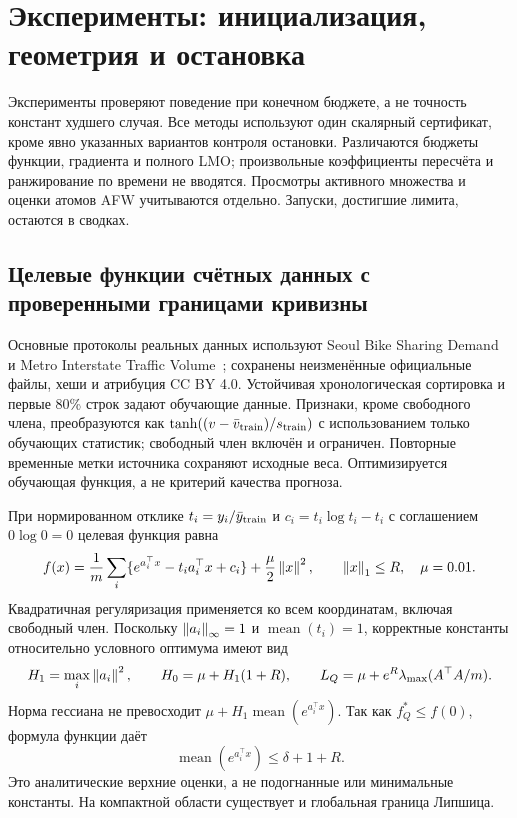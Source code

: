 \section{Эксперименты: инициализация, геометрия и остановка}
\label{sec:experiments}
Эксперименты проверяют поведение при конечном бюджете, а не точность
констант худшего случая. Все методы используют один скалярный
сертификат, кроме явно указанных вариантов контроля остановки.
Различаются бюджеты функции, градиента и полного LMO; произвольные
коэффициенты пересчёта и ранжирование по времени не вводятся.
Просмотры активного множества и оценки атомов AFW учитываются
отдельно. Запуски, достигшие лимита, остаются в сводках.

\subsection{Целевые функции счётных данных с проверенными границами кривизны}
Основные протоколы реальных данных используют Seoul Bike Sharing
Demand~\cite{seoul} и Metro Interstate Traffic Volume~\cite{metro};
сохранены неизменённые официальные файлы, хеши и атрибуция CC BY 4.0.
Устойчивая хронологическая сортировка и первые 80\% строк задают
обучающие данные. Признаки, кроме свободного члена, преобразуются как
$\tanh((v-\bar v_{\rm train})/s_{\rm train})$ с использованием
только обучающих статистик; свободный член включён и ограничен.
Повторные временные метки источника сохраняют исходные веса.
Оптимизируется обучающая функция, а не критерий качества прогноза.

При нормированном отклике $t_i=y_i/\bar y_{\rm train}$ и
$c_i=t_i\log t_i-t_i$ с соглашением $0\log0=0$ целевая функция равна
\begin{equation}\label{eq:poisson}
 f(x)=\frac1m\sum_i\{e^{a_i^\top x}-t_i a_i^\top x+c_i\}
          +\frac{\mu}{2}\left\|x\right\|^2,\qquad \left\|x\right\|_1\le R,
 \quad\mu=0.01.
\end{equation}
Квадратичная регуляризация применяется ко всем координатам, включая
свободный член. Поскольку $\left\|a_i\right\|_\infty=1$ и
$\operatorname{mean}(t_i)=1$, корректные константы относительно
условного оптимума имеют вид
\begin{equation}\label{eq:poissonconstants}
 H_1=\max_i\left\|a_i\right\|^2,\qquad H_0=\mu+H_1(1+R),\qquad
 L_Q=\mu+e^R\lambda_{\max}(A^\top A/m).
\end{equation}
Норма гессиана не превосходит
$\mu+H_1\operatorname{mean}(e^{a_i^\top x})$.
Так как $f_Q^*\le f(0)$, формула функции даёт
\[
 \operatorname{mean}(e^{a_i^\top x})\le\delta+1+R.
\]
Это аналитические верхние оценки, а не подогнанные или минимальные
константы. На компактной области существует и глобальная граница
Липшица.


